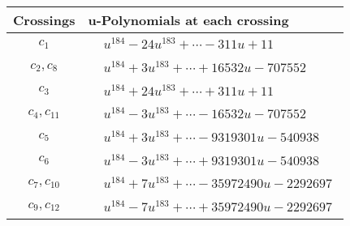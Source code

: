 \documentclass[1p]{elsarticle_modified}
\theoremstyle{definition}
\begin{document}
\begin{tabular}{m{50pt}|m{274pt}}
Crossings & \hspace{64pt}u-Polynomials at each crossing \\
\hline $$\begin{aligned}c_{1}\end{aligned}$$&$\begin{aligned}
&u^{184}-24 u^{183}+\cdots-311 u+11
\end{aligned}$\\
\hline $$\begin{aligned}c_{2},c_{8}\end{aligned}$$&$\begin{aligned}
&u^{184}+3 u^{183}+\cdots+16532 u-707552
\end{aligned}$\\
\hline $$\begin{aligned}c_{3}\end{aligned}$$&$\begin{aligned}
&u^{184}+24 u^{183}+\cdots+311 u+11
\end{aligned}$\\
\hline $$\begin{aligned}c_{4},c_{11}\end{aligned}$$&$\begin{aligned}
&u^{184}-3 u^{183}+\cdots-16532 u-707552
\end{aligned}$\\
\hline $$\begin{aligned}c_{5}\end{aligned}$$&$\begin{aligned}
&u^{184}+3 u^{183}+\cdots-9319301 u-540938
\end{aligned}$\\
\hline $$\begin{aligned}c_{6}\end{aligned}$$&$\begin{aligned}
&u^{184}-3 u^{183}+\cdots+9319301 u-540938
\end{aligned}$\\
\hline $$\begin{aligned}c_{7},c_{10}\end{aligned}$$&$\begin{aligned}
&u^{184}+7 u^{183}+\cdots-35972490 u-2292697
\end{aligned}$\\
\hline $$\begin{aligned}c_{9},c_{12}\end{aligned}$$&$\begin{aligned}
&u^{184}-7 u^{183}+\cdots+35972490 u-2292697
\end{aligned}$\\
\hline
\end{tabular}\\~\\
\end{document}
